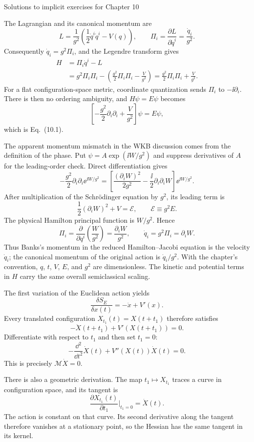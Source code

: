 \begin{bankssolutions}{Solutions to implicit exercises for Chapter 10}

The Lagrangian and its canonical momentum are
\[
  L=\frac1{g^2}\left(\frac12\dot q^i\dot q^i-V(q)\right),
  \qquad
  \Pi_i=\frac{\partial L}{\partial\dot q^i}=\frac{\dot q_i}{g^2}.
\]
Consequently $\dot q_i=g^2\Pi_i$, and the Legendre transform gives
\[
\begin{aligned}
  H&=\Pi_i\dot q^i-L\\
   &=g^2\Pi_i\Pi_i-
     \left(\frac{g^2}{2}\Pi_i\Pi_i-\frac{V}{g^2}\right)
    =\frac{g^2}{2}\Pi_i\Pi_i+\frac{V}{g^2}.
\end{aligned}
\]
For a flat configuration-space metric, coordinate quantization sends
$\Pi_i$ to $-\ii\partial_i$.  There is then no ordering ambiguity, and
$H\psi=E\psi$ becomes
\[
  \left[-\frac{g^2}{2}\partial_i\partial_i+\frac{V}{g^2}\right]\psi
  =E\psi,
\]
which is Eq.~(10.1).

The apparent momentum mismatch in the WKB discussion comes from the definition
of the phase.  Put $\psi=A\exp(\ii W/g^2)$ and suppress derivatives of $A$ for
the leading-order check.  Direct differentiation gives
\[
  -\frac{g^2}{2}\partial_i\partial_i\ee^{\ii W/g^2}
  =\left[\frac{(\partial_iW)^2}{2g^2}
    -\frac{\ii}{2}\partial_i\partial_iW\right]
    \ee^{\ii W/g^2}.
\]
After multiplication of the Schrödinger equation by $g^2$, its leading term is
\[
  \frac12(\partial_iW)^2+V=\mathcal E,
  \qquad \mathcal E\equiv g^2E.
\]
The physical Hamilton principal function is $W/g^2$.  Hence
\[
  \Pi_i=\frac{\partial}{\partial q^i}\left(\frac{W}{g^2}\right)
  =\frac{\partial_iW}{g^2},
  \qquad
  \dot q_i=g^2\Pi_i=\partial_iW.
\]
Thus Banks's momentum in the reduced Hamilton--Jacobi equation is the velocity
$\dot q_i$; the canonical momentum of the original action is
$\dot q_i/g^2$.  With the chapter's convention, $q$, $t$, $V$, $E$, and $g^2$
are dimensionless.  The kinetic and potential terms in $H$ carry the same
overall semiclassical scaling.

The first variation of the Euclidean action yields
\[
  \frac{\delta S_E}{\delta x(t)}=-\ddot x+V'(x).
\]
Every translated configuration $X_{t_1}(t)=X(t+t_1)$ therefore satisfies
\[
  -\ddot X(t+t_1)+V'(X(t+t_1))=0.
\]
Differentiate with respect to $t_1$ and then set $t_1=0$:
\[
  -\frac{\dd^2}{\dd t^2}\dot X(t)+V''(X(t))\dot X(t)=0.
\]
This is precisely $\mathcal M\dot X=0$.

There is also a geometric derivation.  The map
$t_1\mapsto X_{t_1}$ traces a curve in configuration space, and its tangent is
\[
  \frac{\partial X_{t_1}(t)}{\partial t_1}\bigg|_{t_1=0}=\dot X(t).
\]
The action is constant on that curve.  Its second derivative along the tangent
therefore vanishes at a stationary point, so the Hessian has the same tangent
in its kernel.


\end{bankssolutions}
